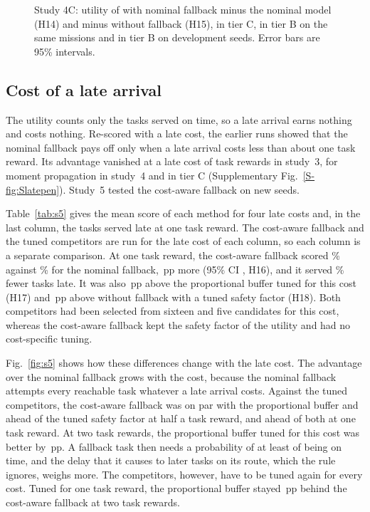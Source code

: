 \begin{figure}[t]
\centering
{}
\caption{Study 4C: utility of \mname{} with nominal fallback minus the nominal model (H14) and minus \mname{} without
fallback (H15), in tier C, in tier B on the same missions and in tier B on development seeds. Error bars are 95\%
intervals.}\label{fig:s4c}
\end{figure}

\subsection{Cost of a late arrival}\label{sec:study5}
The utility counts only the tasks served on time, so a late arrival earns nothing and costs nothing. Re-scored with a
late cost, the earlier runs showed that the nominal fallback pays off only when a late arrival costs less than about
one task reward. Its advantage vanished at a late cost of  task rewards in study~3,
 for moment propagation in study~4 and  in tier C (Supplementary
Fig.~\ref{S-fig:Slatepen}). Study~5 tested the cost-aware fallback on new seeds.

Table~\ref{tab:s5} gives the mean score of each method for four late costs and, in the last column, the tasks served
late at one task reward. The cost-aware fallback and the tuned competitors are run for the late cost of each column,
so each column is a separate comparison. At one task reward, the cost-aware fallback scored \% against
\% for the nominal fallback, \,pp more (95\% CI , H16), and
it served \% fewer tasks late. It was also \,pp above the proportional buffer
tuned for this cost (H17) and \,pp above \mname{} without fallback with a tuned safety factor
(H18). Both competitors had been selected from sixteen and five candidates for this cost, whereas the cost-aware
fallback kept the safety factor of the utility and had no cost-specific tuning.


Fig.~\ref{fig:s5} shows how these differences change with the late cost. The advantage over the nominal fallback grows
with the cost, because the nominal fallback attempts every reachable task whatever a late arrival costs. Against the
tuned competitors, the cost-aware fallback was on par with the proportional buffer and ahead of the tuned safety factor
at half a task reward, and ahead of both at one task reward. At two task rewards, the proportional buffer tuned for
this cost was better by \,pp. A fallback task then needs a probability of at least
 of being on time, and the delay that it causes to later tasks on its route, which the rule ignores,
weighs more. The competitors, however, have to be tuned again for every cost. Tuned for one task reward, the
proportional buffer stayed \,pp behind the cost-aware fallback at two task rewards.

